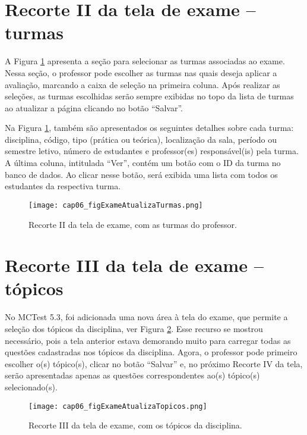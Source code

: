 \section{Recorte II da tela de exame -- turmas}\label{sec:exameTurmas}

A Figura \ref{fig:cap06_figExameAtualizaTurmas} apresenta a seção para selecionar as turmas associadas ao exame. Nessa seção, o professor pode escolher as turmas nas quais deseja aplicar a avaliação, marcando a caixa de seleção na primeira coluna. Após realizar as seleções, as turmas escolhidas serão sempre exibidas no topo da lista de turmas ao atualizar a página clicando no botão ``Salvar''. 

Na Figura \ref{fig:cap06_figExameAtualizaTurmas}, também são apresentados os seguintes detalhes sobre cada turma: disciplina, código, tipo (prática ou teórica), localização da sala, período ou semestre letivo, número de estudantes e professor(es) responsável(is) pela turma. A última coluna, intitulada ``Ver'', contém um botão com o ID da turma no banco de dados. Ao clicar nesse botão, será exibida uma lista com todos os estudantes da respectiva turma.

\begin{figure}[htbp]
  \centering
  \texttt{[image: cap06\_figExameAtualizaTurmas.png]}
  \caption{Recorte II da tela de exame, com as turmas do professor.}
  \label{fig:cap06_figExameAtualizaTurmas}\vspace{-3mm}
\end{figure}

\section{Recorte III da tela de exame -- tópicos}

No MCTest 5.3, foi adicionada uma nova área à tela do exame, que permite a seleção dos tópicos da disciplina, ver Figura \ref{fig:cap06_figExameAtualizaTopicos}. Esse recurso se mostrou necessário, pois a tela anterior estava demorando muito para carregar todas as questões cadastradas nos tópicos da disciplina. Agora, o professor pode primeiro escolher o(s) tópico(s), clicar no botão ``Salvar'' e, no próximo Recorte IV da tela, serão apresentadas apenas as questões correspondentes ao(s) tópico(s) selecionado(s).

\begin{figure}[htbp]
  \centering
  \texttt{[image: cap06\_figExameAtualizaTopicos.png]}
  \caption{Recorte III da tela de exame, com os tópicos da disciplina.}
  \label{fig:cap06_figExameAtualizaTopicos}\vspace{-3mm}
\end{figure}

